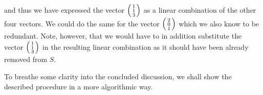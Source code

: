 and thus we have expressed the vector $\begin{psmallmatrix} 1\\1\\3
 \end{psmallmatrix}$ as a linear combination of the other four vectors. We could
 do the same for the vector $\begin{psmallmatrix} 2\\0\\1 \end{psmallmatrix}$
 which we also know to be redundant. Note, however, that we would have to in
 addition substitute the vector $\begin{psmallmatrix} 1 \\ 1 \\ 3
 \end{psmallmatrix}$ in the resulting linear combination as it should have been
 already removed from $S$.

To breathe some clarity into the concluded discussion, we shall show the
described procedure in a more algorithmic way.

